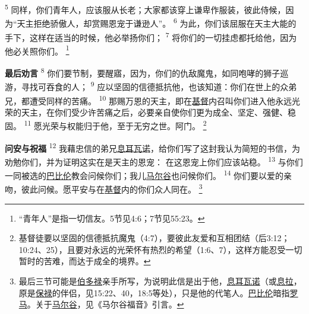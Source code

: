 \textsuperscript{5}
同样，你们青年人，应该服从长老；大家都该穿上谦卑作服装，彼此侍候，因为“天主拒绝骄傲人，却赏赐恩宠于谦逊人”。
\textsuperscript{6}
为此，你们该屈服在天主大能的手下，这样在适当的时候，他必举扬你们；
\textsuperscript{7}
将你们的一切挂虑都托给他，因为他必关照你们。
\footnote{“青年人”是指一切信友。5节见4:6；7节见55:23。}

\textbf{最后劝言\quad}
\textsuperscript{8}
你们要节制，要醒寤，因为，你们的仇敌魔鬼，如同咆哮的狮子巡游，寻找可吞食的人；
\textsuperscript{9}
应以坚固的信德抵抗他，也该知道：你们在世上的众弟兄，都遭受同样的苦痛。
\textsuperscript{10}
那赐万恩的天主，即在\uline{基督}内召叫你们进入他永远光荣的天主，在你们受少许苦痛之后，必要亲自使你们更为成全、坚定、强健、稳固。
\textsuperscript{11}
愿光荣与权能归于他，至于无穷之世。阿门。
\footnote{基督徒要以坚固的信德抵抗魔鬼（4:7），要彼此友爱和互相团结（后3:12；10:24、25），且要对永远的光荣怀有热烈的希望（1:6、7），这样方能忍受一切暂时的苦难，而达于成全的境界。}

\textbf{问安与祝福\quad}
\textsuperscript{12}
我藉忠信的弟兄\uline{息耳瓦诺}，给你们写了这封我认为简短的书信，为劝勉你们，并为证明这实在是天主的恩宠：
在这恩宠上你们应该站稳。
\textsuperscript{13}
与你们一同被选的\uline{巴比伦}教会问候你们；我儿\uline{马尔谷}也问候你们。
\textsuperscript{14}
你们要以爱的亲吻，彼此问候。愿平安与在\uline{基督}内的你们众人同在。
\footnote{最后三节可能是\uline{伯多禄}亲手所写，为说明此信是出于他，\uline{息耳瓦诺}（或\uline{息拉}，原是\uline{保禄}的伴侣，见15:22、40，18:5等处），只是他的代笔人。\uline{巴比伦}暗指\uline{罗马}。关于\uline{马尔谷}，见《马尔谷福音》引言。}